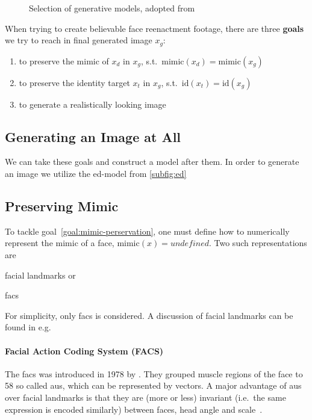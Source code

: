 \begin{figure}[h]
    \centering
    \caption{Selection of generative models, adopted from~\cite{Mirsky.2020}}\label{fig:generative-models}
\end{figure}

When trying to create believable face reenactment footage, there are three \textbf{goals}
we try to reach in final generated image \(x_g\):
\begin{enumerate}[1.)]
    \item to preserve the mimic of \(x_d\) in \(x_g\), s.t.\ \(\text{mimic}(x_d)=\text{mimic}(x_g)\)\label{goal:mimic-perservation}
    \item to preserve the identity target \(x_t\) in \(x_g\), s.t.\ \(\text{id}(x_t)=\text{id}(x_g)\)\label{goal:preserve-identity}
    \item to generate a realistically looking image\label{goal:increase-realism}
\end{enumerate}
\subsection{Generating an Image at All}
We can take these goals and construct a model after them. In order to generate
an image we utilize the \gls{ed}-model from \cref{subfig:ed}

\subsection{Preserving Mimic}
To tackle goal~\ref{goal:mimic-perservation}, one must define how to
numerically represent the mimic of a face, \(\text{mimic}(x)=\textit{undefined}\).
Two such representations are
\begin{enumerate*}[a.)]
    \item facial landmarks or
    \item \gls{facs}
\end{enumerate*}
For simplicity, only \gls{facs} is considered. A discussion of facial landmarks
can be found in e.g.\ \cite{Ha.2020}

\paragraph*{Facial Action Coding System (FACS)}
The \gls{facs} was introduced in 1978 by \textcite{Ekman.1978}. They grouped
muscle regions of the face to 58 so called \glspl{au}, which can be represented
by vectors. A major advantage of \glspl{au} over facial landmarks is that they
are (more or less) invariant (i.e.\ the same expression is encoded similarly)
between faces, head angle and scale~\cite{Pham.2018}.


